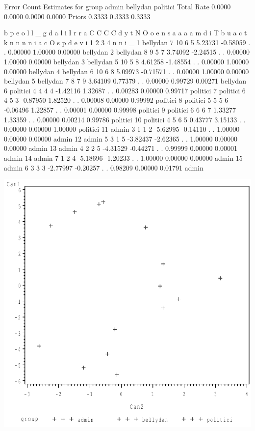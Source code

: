 \documentclass{article}
\begin{document}
\begin{Woutput}
              Error Count Estimates for group
                   admin    bellydan    politici       Total
Rate              0.0000      0.0000      0.0000      0.0000
Priors            0.3333      0.3333      0.3333

                                                      b       p
                                                      e       o
                                                      l       l       _
      g        d                              a       l       i       I
      r     r  a         C        C    C C    d       y       t       N
 O    o     e  n   s     a        a    a a    m       d       i       T
 b    u     a  c t k     n        n    n n    i       a       c       O
 s    p     d  e v i     1        2    3 4    n       n       i       _
 1 bellydan 7 10 6 5  5.23731 -0.58059 . . 0.00000 1.00000 0.00000 bellydan
 2 bellydan 8  9 5 7  3.74092 -2.24515 . . 0.00000 1.00000 0.00000 bellydan
 3 bellydan 5 10 5 8  4.61258 -1.48554 . . 0.00000 1.00000 0.00000 bellydan
 4 bellydan 6 10 6 8  5.09973 -0.71571 . . 0.00000 1.00000 0.00000 bellydan
 5 bellydan 7  8 7 9  3.64109  0.77379 . . 0.00000 0.99729 0.00271 bellydan
 6 politici 4  4 4 4 -1.42116  1.32687 . . 0.00283 0.00000 0.99717 politici
 7 politici 6  4 5 3 -0.87950  1.82520 . . 0.00008 0.00000 0.99992 politici
 8 politici 5  5 5 6 -0.06496  1.22857 . . 0.00001 0.00000 0.99998 politici
 9 politici 6  6 6 7  1.33277  1.33359 . . 0.00000 0.00214 0.99786 politici
10 politici 4  5 6 5  0.43777  3.15133 . . 0.00000 0.00000 1.00000 politici
11 admin    3  1 1 2 -5.62995 -0.14110 . . 1.00000 0.00000 0.00000 admin
12 admin    5  3 1 5 -3.82437 -2.62365 . . 1.00000 0.00000 0.00000 admin
13 admin    4  2 2 5 -4.31529 -0.44271 . . 0.99999 0.00000 0.00001 admin
14 admin    7  1 2 4 -5.18696 -1.20233 . . 1.00000 0.00000 0.00000 admin
15 admin    6  3 3 3 -2.77997 -0.20257 . . 0.98209 0.00000 0.01791 admin
\end{Woutput}
\includegraphics[]{profile2-1-SAS-fig.pdf}
\end{document}
